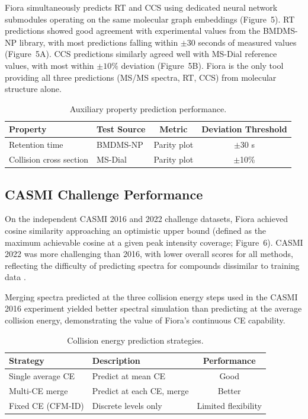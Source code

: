 \documentclass[11pt]{article}
\begin{document}
Fiora simultaneously predicts RT and CCS using dedicated neural network submodules operating on the same molecular graph embeddings (Figure~5). RT predictions showed good agreement with experimental values from the BMDMS-NP library, with most predictions falling within $\pm 30$ seconds of measured values (Figure~5A). CCS predictions similarly agreed well with MS-Dial reference values, with most within $\pm 10\%$ deviation (Figure~5B). Fiora is the only tool providing all three predictions (MS/MS spectra, RT, CCS) from molecular structure alone.

\begin{table}[H]
\centering
\caption{Auxiliary property prediction performance.}
\label{tab:auxiliary}
\begin{tabular}{llcc}
\toprule
Property & Test Source & Metric & Deviation Threshold \\
\midrule
Retention time & BMDMS-NP & Parity plot & $\pm$30 s \\
Collision cross section & MS-Dial & Parity plot & $\pm$10\% \\
\bottomrule
\end{tabular}
\end{table}

\subsection{CASMI Challenge Performance}

On the independent CASMI 2016 and 2022 challenge datasets, Fiora achieved cosine similarity approaching an optimistic upper bound (defined as the maximum achievable cosine at a given peak intensity coverage; Figure~6). CASMI 2022 was more challenging than 2016, with lower overall scores for all methods, reflecting the difficulty of predicting spectra for compounds dissimilar to training data \citep{Schymanski2017,Nothias2022}.

Merging spectra predicted at the three collision energy steps used in the CASMI 2016 experiment yielded better spectral simulation than predicting at the average collision energy, demonstrating the value of Fiora's continuous CE capability.

\begin{table}[H]
\centering
\caption{Collision energy prediction strategies.}
\label{tab:ce}
\begin{tabular}{llc}
\toprule
Strategy & Description & Performance \\
\midrule
Single average CE & Predict at mean CE & Good \\
Multi-CE merge & Predict at each CE, merge & Better \\
Fixed CE (CFM-ID) & Discrete levels only & Limited flexibility \\
\bottomrule
\end{tabular}
\end{table}
\end{document}
